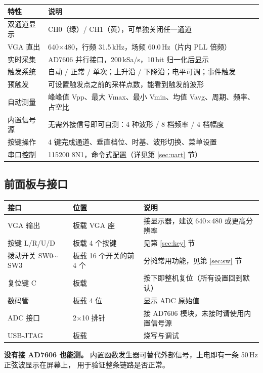 \documentclass[UTF8,a4paper,11pt]{ctexart}
\begin{document}
\begin{center}
\small
\begin{tabular}{ll}
\toprule
特性 & 说明\\
\midrule
双通道显示 & CH0（绿）/ CH1（黄），可单独关闭任一通道\\
VGA 直出 & 640$\times$480，行频 31.5\,kHz，场频 60.0\,Hz（片内 PLL 倍频）\\
实时采集 & AD7606 并行接口，200\,kSa/s，10\,bit 归一化后显示\\
触发系统 & 自动 / 正常 / 单次；上升沿 / 下降沿；电平可调；事件触发\\
预触发 & 可设置触发点之前的采样点数，能看到触发前波形\\
自动测量 & 峰峰值 Vpp、最大 Vmax、最小 Vmin、均值 Vavg、周期、频率、占空比\\
内置信号源 & 无需外接信号即可自测：4 种波形 / 8 档频率 / 4 档幅度\\
按键操作 & 4 键完成通道、垂直档位、时基、波形切换、菜单设置\\
串口控制 & 115200 8N1，命令式配置（详见第 \ref{sec:uart} 节）\\
\bottomrule
\end{tabular}
\end{center}

\subsection{前面板与接口}

\begin{center}
\small
\begin{tabular}{lll}
\toprule
接口 & 位置 & 说明\\
\midrule
VGA 输出 & 板载 VGA 座 & 接显示器，建议 640$\times$480 或更高分辨率\\
按键 L/R/U/D & 板载 4 个按键 & 见第 \ref{sec:key} 节\\
拨动开关 SW0$\sim$SW3 & 板载 16 个开关的前 4 个 & 分摊常用功能，见第 \ref{sec:sw} 节\\
复位键 C & 板载 & 按下即整机复位（所有设置回到默认）\\
数码管 & 板载 4 位 & 显示 ADC 原始值\\
ADC 接口 & 2$\times$10 排针 & 接 AD7606 模块，未接时请使用内置信号源\\
USB-JTAG & 板载 & 烧写与调试\\
\bottomrule
\end{tabular}
\end{center}

\begin{tipbox}
\textbf{没有接 AD7606 也能测。}
内置函数发生器可替代外部信号，上电即有一条 50\,Hz 正弦波显示在屏幕上，
用于验证整条链路是否正常。
\end{tipbox}
\end{document}
